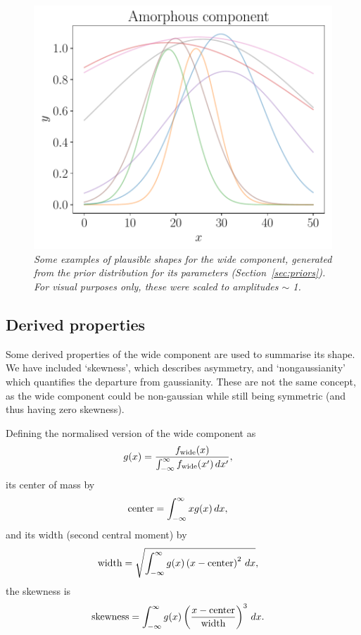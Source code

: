 \documentclass[a4paper, 12pt]{elsarticle}
\newcommand{\x}{x}
\begin{document}
\begin{figure}[!ht]
\centering
\includegraphics[scale=0.7]{figures/wide_component.pdf}
\caption{\it Some examples of plausible shapes for the wide component,
generated from the prior distribution for its parameters
(Section~\ref{sec:priors}). For visual purposes only, these
were scaled to amplitudes $\sim$ 1. \label{fig:wide_component}}
\end{figure}

\subsection{Derived properties}
Some derived properties of the wide component are used to summarise its shape.
We have included `skewness', which describes asymmetry, and `nongaussianity'
which quantifies the departure from gaussianity. These are not the same
concept, as the wide component could be non-gaussian while still being symmetric
(and thus having zero skewness).

Defining the normalised version of the wide component as
\begin{align}
g(\x) &= \frac{f_{\rm wide}(\x)}
             {\int_{-\infty}^\infty f_{\rm wide}(\x') \, d\x'},
\end{align}
its center of mass by
\begin{align}
\textnormal{center} &= \int_{-\infty}^\infty x g(\x) \, d\x,
\end{align}
and its width (second central moment) by
\begin{align}
\textnormal{width} &= \sqrt{\int_{-\infty}^\infty
                            g(\x) \left(\x - \textnormal{center}\right)^2
                            \, d\x},
\end{align}
the skewness is
\begin{align}
\textnormal{skewness} &= \int_{-\infty}^\infty
                           g(\x) 
                           \left(
                             \frac{x - \textnormal{center}}{\textnormal{width}}
                           \right)^3
                         \, d\x.
\end{align}
\end{document}
